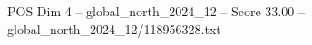 \begin{textsample}{POS Dim 4 – global\_north\_2024\_12 – Score 33.00 – global\_north\_2024\_12/118956328.txt}
\end{textsample}
